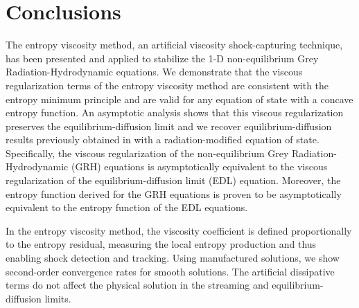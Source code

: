 \documentclass[review]{elsarticle}
\begin{document}
\section{Conclusions}
\label{sec:ccl}

The entropy viscosity method, an artificial viscosity shock-capturing technique, has been presented 
and applied to stabilize the 1-D non-equilibrium Grey Radiation-Hydrodynamic equations. 
We demonstrate that the viscous regularization terms of the entropy viscosity method are consistent with 
the entropy minimum principle and are valid for any equation of state with a concave entropy function. 
%
An asymptotic analysis shows that this viscous regularization preserves the equilibrium-diffusion limit 
and we recover equilibrium-diffusion results previously obtained in \cite{LowrieMorel} with a radiation-modified equation of state. 
Specifically, the viscous regularization of the non-equilibrium Grey Radiation-Hydrodynamic (GRH) equations 
is asymptotically equivalent to the viscous regularization of the equilibrium-diffusion limit (EDL) equation. 
Moreover, the entropy function derived for the GRH equations is proven to be asymptotically equivalent to 
the entropy function of the EDL equations.



In the entropy viscosity method, the viscosity coefficient is defined proportionally to the entropy residual, measuring 
the local entropy production and thus enabling shock detection and tracking. 
%
Using manufactured solutions, we show second-order convergence rates for smooth solutions. The artificial dissipative terms do not affect the physical solution in the streaming and equilibrium-diffusion limits. 
\end{document}
